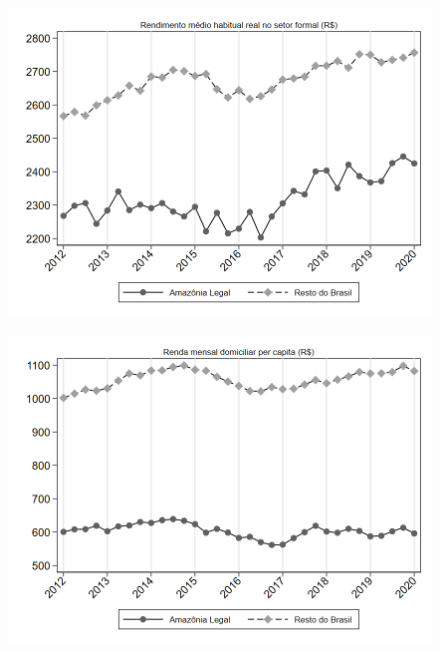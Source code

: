 \begin{frame}[label=_estrutura_renda_rendimento_medio_formal]{}
\textit{\hyperlink{_estrutura_renda}{}}
\begin{figure}
  \centering
  \includegraphics[width=1.0\linewidth]{../../analysis/output/estrutura_renda/_estrutura_renda_rendimento_medio_formal.png}
  \caption{}
  \label{fig:_estrutura_renda_rendimento_medio_formal}
\end{figure}
\end{frame}

\begin{frame}[label=_estrutura_renda_rendimento_domiciliar_pc]{}
\textit{\hyperlink{_estrutura_renda}{}}
\begin{figure}
  \centering
  \includegraphics[width=1.0\linewidth]{../../analysis/output/estrutura_renda/_estrutura_renda_rendimento_domiciliar_pc.png}
  \caption{}
  \label{fig:_estrutura_renda_rendimento_domiciliar_pc}
\end{figure}
\end{frame}


